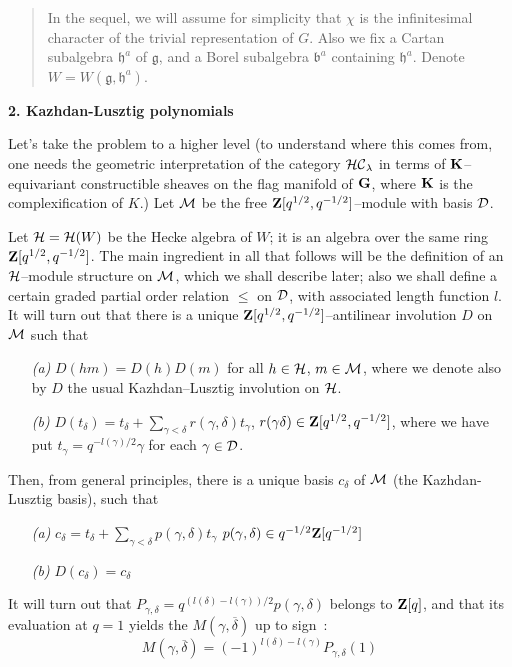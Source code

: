 \documentclass[11 pt]{article}
\def\ds{\displaystyle}
\def\ov{\overline}
\def\b{{\mathfrak b}}
\def\D{{\cal D}}
\def\d{\delta}
\def\G{{\bf G}}
\def\g{\gamma}
\def\gf{{\mathfrak g}}
\def\HC{{\cal HC}}
\def\Hc{{\cal H}}
\def\hf{{\mathfrak h}}
\def\K{{\bf K}}
\def\l{\lambda}
\def\M{{\cal M}}
\def\Z{{\bf Z}}
\def\Zq{\Z[q^{1/2},q^{-1/2}]}
\begin{document}
\medskip

\begin{quote}\noindent
In the sequel, we will assume for simplicity that $\chi$ is the infinitesimal
character of the trivial representation of $G$. Also we fix a Cartan subalgebra
$\hf^a$ of $\gf$, and a Borel subalgebra $\b^a$ containing $\hf^a$. Denote
$W=W(\gf,\hf^a)$.
\end{quote}

\vfill\eject

\noindent\textbf{2. Kazhdan-Lusztig polynomials}

\medskip

Let's take the problem to a higher level (to understand where this comes from,
one needs the geometric interpretation of the category $\HC_\l$ in terms of
$\K$--equivariant constructible sheaves on the flag manifold of $\G$, where
$\K$ is the complexification of $K$.) Let $\M$ be the free $\Zq$--module with
basis $\D$.

Let $\Hc=\Hc(W)$ be the Hecke algebra of $W$; it is an algebra over the
same ring $\Zq$. The main ingredient in all that follows will be the
definition of an $\Hc$--module structure on $\M$, which we shall describe
later; also we shall define a certain graded partial order relation $\leq$ on
$\D$, with associated length function $l$. It will turn out that there is a
unique $\Zq$--antilinear involution $D$ on $\M$ such that

\begin{itemize}
\item[\it(a)]$D(hm)=D(h)D(m)$ for all $h\in\Hc$, $m\in\M$, where we denote
also by $D$ the usual Kazhdan--Lusztig involution on $\Hc$.
\item[\it(b)]$D(t_\d)=t_\d+\sum_{\g<\d}r(\g,\d)t_\g$, $r(\g\d)\in\Zq$, where
we have put $t_\g=q^{-l(\g)/2}\g$ for each $\g\in\D$.
\end{itemize}

Then, from general principles, there is a unique basis $c_\d$ of $\M$ (the
Kazhdan-Lusztig basis), such that

\begin{itemize}
\item[\it(a)]$\ds{c_\d=t_\d+\sum_{\g<\d}p(\g,\d)t_\g}$\hspace{.5cm}
$p(\g,\d)\in q^{-1/2}\Z[q^{-1/2}]$
\item[\it(b)]$D(c_\d)=c_\d$
\end{itemize}

It will turn out that $P_{\g,\d}=q^{(l(\d)-l(\g))/2}p(\g,\d)$ belongs to
$\Z[q]$, and that its evaluation at $q=1$ yields the $M(\g,\ov\d)$ up to sign~:
$$
M(\g,\ov\d)=(-1)^{l(\d)-l(\g)}P_{\g,\d}(1)
$$
\end{document}
